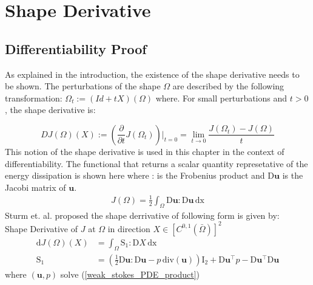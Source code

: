 \section{Shape Derivative}
\subsection{Differentiability Proof}

\vfill

As explained in the introduction, the existence of the shape derivative needs to be shown.
The perturbations of the shape $\Omega$ are described by the following transformation: $\Omega_t := (Id + tX )(\Omega)$ where.
For small perturbations and $t > 0$, the shape derivative is: \cite{fully_semi_paper_sturm}

\begin{equation}\label{shape_derrivative_t_limit}
	DJ(\Omega)(X) := \left(\frac{\partial}{\partial t}J(\Omega_t)\right)\bigg\rvert_{t=0} = \lim_{t \to 0} \frac{J(\Omega_t)-J(\Omega)}{t}
\end{equation}
This notion of the shape derivative is used in this chapter in the context of differentiability. The functional that returns a scalar quantity 
represetative of the energy dissipation is shown here where : is the Frobenius product and $\mathrm{D} \mathbf{u}$ is the Jacobi matrix of $\mathbf{u}$.
\begin{align}\label{energy_dissipation_equation}
	J(\Omega) = \frac{1}{2} \int_{\Omega} \mathrm{D} \mathbf{u} : \mathrm{D} \mathbf{u} \, \mathrm{dx}
\end{align}
Sturm et. al. \cite{nearly_conformal_paper} proposed the shape derrivative of following form is given by: \\
Shape Derivative of $J$ at $\Omega$ in direction $ X \in [C^{0,1}(\bar{\Omega})]^2 $
\begin{align}\label{shape_derivative_S1}
	\mathrm{d}J(\Omega)(X) &= \int_{\Omega} \mathrm{S}_1 : \mathrm{D}X \, \mathrm{dx} \\
	\mathrm{S}_1 &= \left( \frac{1}{2}\mathrm{D} \mathbf{u} : \mathrm{D} \mathbf{u} - p \, \mathrm{div}(\mathbf{u}) \right)
	\mathrm{I}_2 + \mathrm{D} \mathbf{u}^{\top}p - \mathrm{D} \mathbf{u}^{\top} \mathrm{D} \mathbf{u}
\end{align}
where $(\mathbf{u},p)$ solve (\ref*{weak_stokes_PDE_product})
